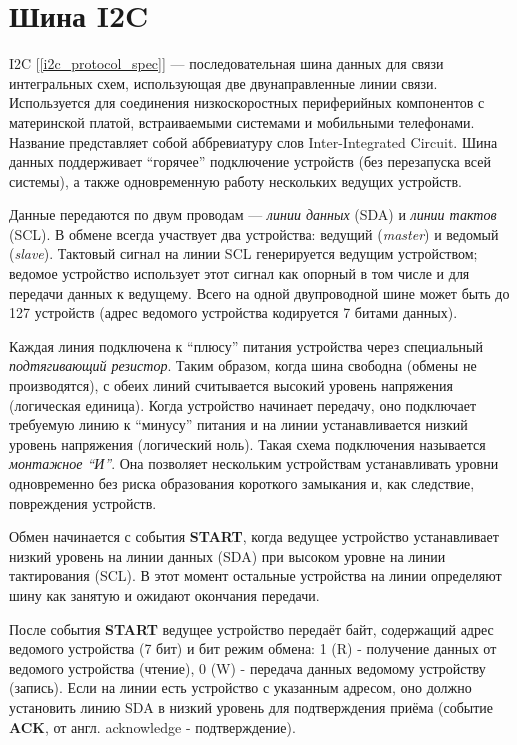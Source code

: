\section{Шина I2C}

\label{i2c_bus}

I2C [\ref{i2c_protocol_spec}] — последовательная шина данных для связи интегральных схем, использующая две двунаправленные линии связи. Используется для соединения низкоскоростных периферийных компонентов с материнской платой, встраиваемыми системами и мобильными телефонами. Название представляет собой аббревиатуру слов Inter-Integrated Circuit. Шина данных поддерживает ``горячее'' подключение устройств (без перезапуска всей системы), а также одновременную работу нескольких ведущих устройств.

Данные передаются по двум проводам — \textit{линии данных} (SDA) и \textit{линии тактов} (SCL). В обмене всегда участвует два устройства: ведущий (\textit{master}) и ведомый (\textit{slave}). Тактовый сигнал на линии SCL генерируется ведущим устройством; ведомое устройство использует этот сигнал как опорный в том числе и для передачи данных к ведущему. Всего на одной двупроводной шине может быть до 127 устройств (адрес ведомого устройства кодируется 7 битами данных).

Каждая линия подключена к ``плюсу'' питания устройства через специальный \textit{подтягивающий резистор}. Таким образом, когда шина свободна  (обмены не производятся), с обеих линий считывается высокий уровень напряжения (логическая единица). Когда устройство начинает передачу, оно подключает требуемую линию к ``минусу'' питания и на линии устанавливается низкий уровень напряжения (логический ноль). Такая схема подключения называется \textit{монтажное ``И''}. Она позволяет нескольким устройствам устанавливать уровни одновременно без риска образования короткого замыкания и, как следствие, повреждения устройств.

Обмен начинается с события \textbf{START}, когда ведущее устройство устанавливает низкий уровень на линии данных (SDA) при высоком уровне на линии тактирования (SCL). В этот момент остальные устройства на линии определяют шину как занятую и ожидают окончания передачи.

После события \textbf{START} ведущее устройство передаёт байт, содержащий адрес ведомого устройства (7 бит) и бит режим обмена: 1 (R) - получение данных от ведомого устройства (чтение), 0 (W) - передача данных ведомому устройству (запись). Если на линии есть устройство с указанным адресом, оно должно установить линию SDA в низкий уровень для подтверждения приёма (событие \textbf{ACK}, от англ. acknowledge - подтверждение).

